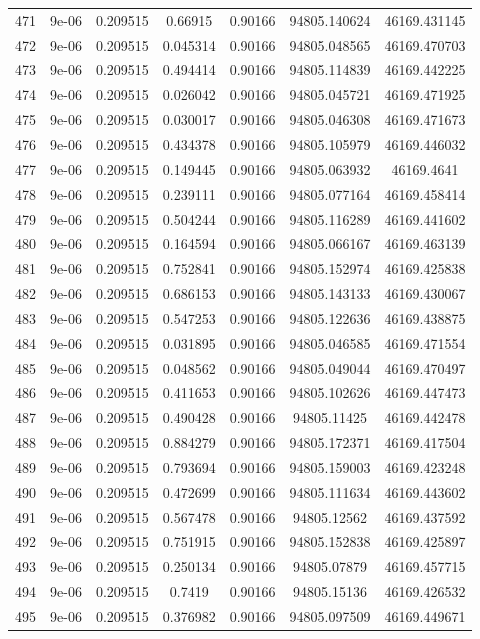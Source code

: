 \begin{table}
\begin{tabular*}{\linewidth}{c|c|c|c|c|c|c}
471 & 9e-06 & 0.209515 & 0.66915 & 0.90166 & 94805.140624 & 46169.431145\\
472 & 9e-06 & 0.209515 & 0.045314 & 0.90166 & 94805.048565 & 46169.470703\\
473 & 9e-06 & 0.209515 & 0.494414 & 0.90166 & 94805.114839 & 46169.442225\\
474 & 9e-06 & 0.209515 & 0.026042 & 0.90166 & 94805.045721 & 46169.471925\\
475 & 9e-06 & 0.209515 & 0.030017 & 0.90166 & 94805.046308 & 46169.471673\\
476 & 9e-06 & 0.209515 & 0.434378 & 0.90166 & 94805.105979 & 46169.446032\\
477 & 9e-06 & 0.209515 & 0.149445 & 0.90166 & 94805.063932 & 46169.4641\\
478 & 9e-06 & 0.209515 & 0.239111 & 0.90166 & 94805.077164 & 46169.458414\\
479 & 9e-06 & 0.209515 & 0.504244 & 0.90166 & 94805.116289 & 46169.441602\\
480 & 9e-06 & 0.209515 & 0.164594 & 0.90166 & 94805.066167 & 46169.463139\\
481 & 9e-06 & 0.209515 & 0.752841 & 0.90166 & 94805.152974 & 46169.425838\\
482 & 9e-06 & 0.209515 & 0.686153 & 0.90166 & 94805.143133 & 46169.430067\\
483 & 9e-06 & 0.209515 & 0.547253 & 0.90166 & 94805.122636 & 46169.438875\\
484 & 9e-06 & 0.209515 & 0.031895 & 0.90166 & 94805.046585 & 46169.471554\\
485 & 9e-06 & 0.209515 & 0.048562 & 0.90166 & 94805.049044 & 46169.470497\\
486 & 9e-06 & 0.209515 & 0.411653 & 0.90166 & 94805.102626 & 46169.447473\\
487 & 9e-06 & 0.209515 & 0.490428 & 0.90166 & 94805.11425 & 46169.442478\\
488 & 9e-06 & 0.209515 & 0.884279 & 0.90166 & 94805.172371 & 46169.417504\\
489 & 9e-06 & 0.209515 & 0.793694 & 0.90166 & 94805.159003 & 46169.423248\\
490 & 9e-06 & 0.209515 & 0.472699 & 0.90166 & 94805.111634 & 46169.443602\\
491 & 9e-06 & 0.209515 & 0.567478 & 0.90166 & 94805.12562 & 46169.437592\\
492 & 9e-06 & 0.209515 & 0.751915 & 0.90166 & 94805.152838 & 46169.425897\\
493 & 9e-06 & 0.209515 & 0.250134 & 0.90166 & 94805.07879 & 46169.457715\\
494 & 9e-06 & 0.209515 & 0.7419 & 0.90166 & 94805.15136 & 46169.426532\\
495 & 9e-06 & 0.209515 & 0.376982 & 0.90166 & 94805.097509 & 46169.449671\\
\end{tabular*}
\end{table}
